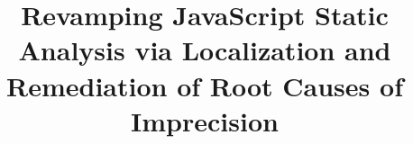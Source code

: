 \documentclass{sig-alternate-05-2015}
\begin{document}
\renewcommand{\arraystretch}{1.5}








%

\title{Revamping JavaScript Static Analysis via Localization and Remediation of Root Causes of Imprecision}
%
%
%
%
%

%
%
%
\end{document}
